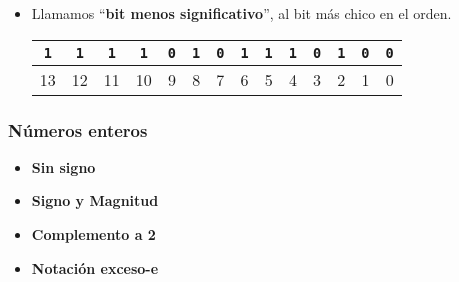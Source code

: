\documentclass[aspectratio=169]{beamer}
\begin{document}
\begin{frame}[fragile,t]
\begin{itemize}
     \item Llamamos ``\textbf{bit menos significativo}'', al bit más chico en el orden. %
     \begin{tabular}{cccccccccccccc}
     \textcolor{Gris}{\texttt{1}} & \textcolor{Gris}{\texttt{1}} & \textcolor{Gris}{\texttt{1}} & \textcolor{Gris}{\texttt{1}} & \textcolor{Gris}{\texttt{0}} & \textcolor{Gris}{\texttt{1}} & \textcolor{Gris}{\texttt{0}} & \textcolor{Gris}{\texttt{1}} & \textcolor{Gris}{\texttt{1}} & \textcolor{Gris}{\texttt{1}} & \textcolor{Gris}{\texttt{0}} & \textcolor{Gris}{\texttt{1}} & \textcolor{Gris}{\texttt{0}} & \textcolor{naranjauca}{\texttt{0}} \\
     \hline
     {\scriptsize 13} & {\scriptsize 12} & {\scriptsize 11} & {\scriptsize 10} & {\scriptsize 9} & {\scriptsize 8} & {\scriptsize 7} & {\scriptsize 6} & {\scriptsize 5} & {\scriptsize 4} & {\scriptsize 3} & {\scriptsize 2} & {\scriptsize 1} & \textcolor{naranjauca}{\normalsize 0} \\
     \end{tabular}     
    \end{itemize}
\end{frame}

\begin{frame}[fragile]
    \frametitle{Números enteros}
    \begin{itemize}
    \setlength\itemsep{10px}
    \item \textbf{Sin signo}\\
    \item \textbf{Signo y Magnitud}\\
    \item \textbf{Complemento a 2}\\
    \item \textbf{Notación exceso-e}\\
    \end{itemize}
\end{frame}
\end{document}
